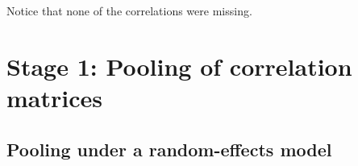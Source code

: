 \documentclass[
]{book}
\newenvironment{Shaded}{\begin{snugshade}}{\end{snugshade}}
\newcommand{\AttributeTok}[1]{\textcolor[rgb]{0.77,0.63,0.00}{#1}}
\newcommand{\CommentTok}[1]{\textcolor[rgb]{0.56,0.35,0.01}{\textit{#1}}}
\newcommand{\FunctionTok}[1]{\textcolor[rgb]{0.00,0.00,0.00}{#1}}
\newcommand{\NormalTok}[1]{#1}
\newcommand{\OtherTok}[1]{\textcolor[rgb]{0.56,0.35,0.01}{#1}}
\newcommand{\SpecialCharTok}[1]{\textcolor[rgb]{0.00,0.00,0.00}{#1}}
\newcommand{\StringTok}[1]{\textcolor[rgb]{0.31,0.60,0.02}{#1}}
\begin{document}
Notice that none of the correlations were missing.

\hypertarget{stage-1-pooling-of-correlation-matrices}{%
\section{Stage 1: Pooling of correlation matrices}\label{stage-1-pooling-of-correlation-matrices}}

\hypertarget{pooling-under-a-random-effects-model}{%
\subsection{Pooling under a random-effects model}\label{pooling-under-a-random-effects-model}}

\begin{Shaded}
\end{Shaded}
\end{document}
